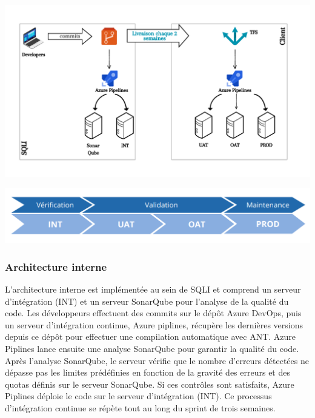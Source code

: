\begin{center}
    \centering
    \includegraphics[width=19cm]{Figures/Test.png}
    \label{fig:processus}
\end{center}
\begin{center}
    \centering
    \includegraphics[width=19cm]{Figures/UAT.png}
    \label{fig:processus}
\end{center}



\subsubsection{Architecture interne}
L'architecture interne est implémentée au sein de SQLI et comprend un serveur d'intégration (INT) et un serveur SonarQube pour l'analyse de la qualité du code. Les développeurs effectuent des commits sur le dépôt Azure DevOps, puis un serveur d'intégration continue, Azure piplines, récupère les dernières versions depuis ce dépôt pour effectuer une compilation automatique avec ANT. Azure Piplines lance ensuite une analyse SonarQube pour garantir la qualité du code. Après l'analyse SonarQube, le serveur vérifie que le nombre d'erreurs détectées ne dépasse pas les limites prédéfinies en fonction de la gravité des erreurs et des quotas définis sur le serveur SonarQube. Si ces contrôles sont satisfaits, Azure Piplines déploie le code sur le serveur d'intégration (INT). Ce processus d'intégration continue se répète tout au long du sprint de trois semaines.


